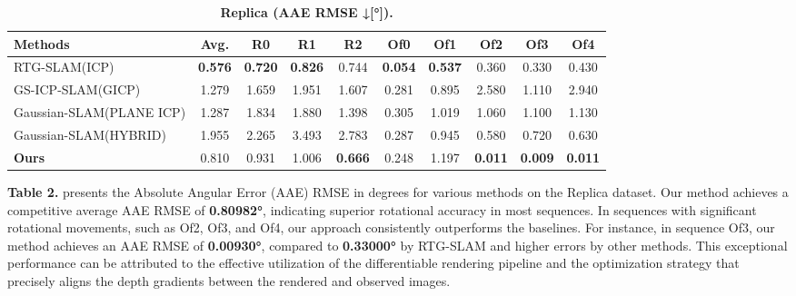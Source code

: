 \documentclass[twocolumn]{article} %
\begin{document}
\begin{table}[htbp]
\renewcommand{\thetable}{\textbf{\arabic{table}}}
\renewcommand{\tablename}{\textbf{Table}}
\centering
\caption{\textbf{Replica\cite{straubReplicaDatasetDigital2019} (AAE RMSE ↓[°]).}}
\label{table:replica_AAE}
\begin{adjustbox}{max width=\columnwidth,max height=!,center}
\begin{tabular}{lccccccccc}
\toprule
\textbf{Methods} & \textbf{Avg.} & \textbf{R0} & \textbf{R1} & \textbf{R2} & \textbf{Of0} & \textbf{Of1} & \textbf{Of2} & \textbf{Of3} & \textbf{Of4}\\
\midrule
RTG-SLAM(ICP)\cite{pengRTGSLAMRealtime3D2024} & \cellcolor{green!30}\textbf{0.576} & \cellcolor{green!30}\textbf{0.720} & \cellcolor{green!30}\textbf{0.826} & \cellcolor{yellow!30}0.744 & \cellcolor{green!30}\textbf{0.054} & \cellcolor{green!30}\textbf{0.537} & \cellcolor{yellow!30}0.360 & \cellcolor{yellow!30}0.330 & \cellcolor{yellow!30}0.430\\
GS-ICP-SLAM(GICP)\cite{haRGBDGSICPSLAM2024} & \cellcolor{lime!50}1.279 & \cellcolor{lime!50}1.659 & 1.951 & 1.607 & \cellcolor{lime!50}0.281 & \cellcolor{yellow!30}0.895 & 2.580 & 1.110 & 2.940\\
Gaussian-SLAM(PLANE ICP)\cite{yugayGaussianSLAMPhotorealisticDense2024} & 1.287 & 1.834 & \cellcolor{lime!50}1.880 & \cellcolor{lime!50}1.398 & 0.305 & 1.019 & 1.060 & 1.100 & 1.130\\
Gaussian-SLAM(HYBRID)\cite{yugayGaussianSLAMPhotorealisticDense2024} & 1.955 & 2.265 & 3.493 & 2.783 & 0.287 & \cellcolor{lime!50}0.945 & \cellcolor{lime!50}0.580 & \cellcolor{lime!50}0.720 & \cellcolor{lime!50}0.630\\
\midrule
\textbf{Ours} & \cellcolor{yellow!30}0.810 & \cellcolor{yellow!30}0.931 & \cellcolor{yellow!30}1.006 & \cellcolor{green!30}\textbf{0.666} & \cellcolor{yellow!30}0.248 & 1.197 & \cellcolor{green!30}\textbf{0.011} & \cellcolor{green!30}\textbf{0.009} & \cellcolor{green!30}\textbf{0.011}\\
\bottomrule
\end{tabular}
\end{adjustbox}
\end{table}

\textbf{Table 2.} presents the Absolute Angular Error (AAE) RMSE in
degrees for various methods on the Replica dataset. Our method achieves
a competitive average AAE RMSE of \textbf{0.80982°}, indicating superior
rotational accuracy in most sequences. In sequences with significant
rotational movements, such as Of2, Of3, and Of4, our approach
consistently outperforms the baselines. For instance, in sequence Of3,
our method achieves an AAE RMSE of \textbf{0.00930°}, compared to
\textbf{0.33000°} by RTG-SLAM and higher errors by other methods. This
exceptional performance can be attributed to the effective utilization
of the differentiable rendering pipeline and the optimization strategy
that precisely aligns the depth gradients between the rendered and
observed images.
\end{document}
